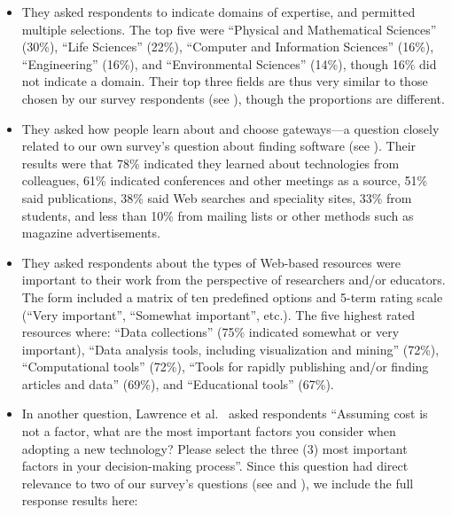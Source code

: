 \documentclass{casicswhitepaper}
\begin{document}
\begin{itemize}

\item They asked respondents to indicate domains of expertise, and permitted multiple selections.  The top five were ``Physical and Mathematical Sciences'' (30\%), ``Life Sciences'' (22\%), ``Computer and Information Sciences'' (16\%), ``Engineering'' (16\%), and ``Environmental Sciences'' (14\%), though 16\% did not indicate a domain.  Their top three fields are thus very similar to those chosen by our survey respondents (see ), though the proportions are different.

\item They asked how people learn about and choose gateways---a question closely related to our own survey's question about finding software (see ).  Their results were that 78\% indicated they learned about technologies from colleagues, 61\% indicated conferences and other meetings as a source, 51\% said publications, 38\% said Web searches and speciality sites, 33\% from students, and less than 10\% from mailing lists or other methods such as magazine advertisements.

\item They asked respondents about the types of Web-based resources were important to their work from the perspective of researchers and/or educators.  The form included a matrix of ten predefined options and 5-term rating scale (``Very important'', ``Somewhat important'', etc.).  The five highest rated resources where: ``Data collections'' (75\% indicated somewhat or very important), ``Data analysis tools, including visualization and mining'' (72\%), ``Computational tools'' (72\%), ``Tools for rapidly publishing and/or finding articles and data'' (69\%), and ``Educational tools'' (67\%).

\item In another question, Lawrence et al.~\cite{lawrence2015science} asked respondents ``Assuming cost is not a factor, what are the most important factors you consider when adopting a new technology? Please select the three (3) most important factors in your decision-making process''.  Since this question had direct relevance to two of our survey's questions (see  and ), we include the full response results here:


\end{itemize}
\end{document}
